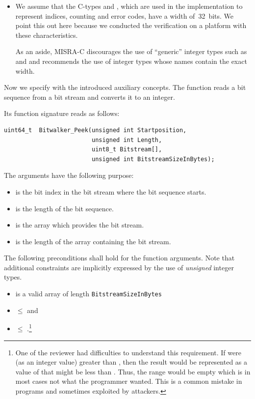 \begin{itemize}
\item 
We assume that the C-types  and , which
are used in the implementation to represent indices, counting and error codes,
have a width of~32~bits.
We point this out here because we conducted the verification on a platform with
these characteristics.

As an aside, MISRA-C discourages the use of ``generic'' integer types
such as  and  and recommends the use of integer types whose names
contain the exact width.

\end{itemize}

Now we specify \peek with the introduced auxiliary concepts.
The function \peek reads a bit sequence from a bit stream
and converts it to an integer.

Its function signature reads as follows:

\begin{lstlisting}[style=acsl-block]
uint64_t  Bitwalker_Peek(unsigned int Startposition, 
                         unsigned int Length,
                         uint8_t Bitstream[],
                         unsigned int BitstreamSizeInBytes);
\end{lstlisting}

The arguments have the following purpose:
\begin{itemize}
    \item {} is the bit index in the bit stream 
    where the bit sequence starts.
    \item {} is the length of the bit sequence.
    \item {} is the array which provides the bit stream.
    \item {} is the length of the array 
    containing the bit stream. 
\end{itemize}

The following preconditions shall hold for the function arguments.
Note that additional constraints are implicitly expressed by the use
of \emph{unsigned} integer types.

\begin{itemize}
\item {} is a valid array of length \verb"BitstreamSizeInBytes"

\item {} $\leq$  and

\item {} $\leq$ .\footnote{%
      One of the reviewer had difficulties to understand this requirement.
      If  were (as an integer value) greater
      than , then the result would be represented as a value of
       that might be less than .
      Thus, the range  would be
      empty which is in most cases not what the programmer wanted.
      This is a common mistake in programs and sometimes exploited by attackers.
}
\end{itemize}

